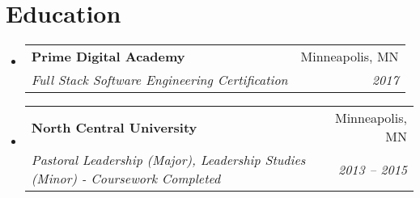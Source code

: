 \documentclass[letterpaper,12pt]{article}
\makeatletter
\newcommand{\resumeSubheading}[4]{
  \vspace{-2pt}\item
    \begin{tabular*}{0.97\textwidth}[t]{l@{\extracolsep{\fill}}r}
      \textbf{#1} & #2 \\
      \textit{\small#3} & \textit{\small #4} \\
    \end{tabular*}\vspace{-7pt}
}
\newcommand{\resumeSubHeadingListStart}{\begin{itemize}[leftmargin=0.15in, label={}]}
\newcommand{\resumeSubHeadingListEnd}{\end{itemize}}
\makeatother
\begin{document}
\section{Education}
  \resumeSubHeadingListStart
    \resumeSubheading
      {Prime Digital Academy}{Minneapolis, MN}
      {Full Stack Software Engineering Certification}{2017}
    \resumeSubheading
      {North Central University}{Minneapolis, MN}
      {Pastoral Leadership (Major), Leadership Studies (Minor) - Coursework Completed}{2013 – 2015}
  \resumeSubHeadingListEnd


\end{document}
